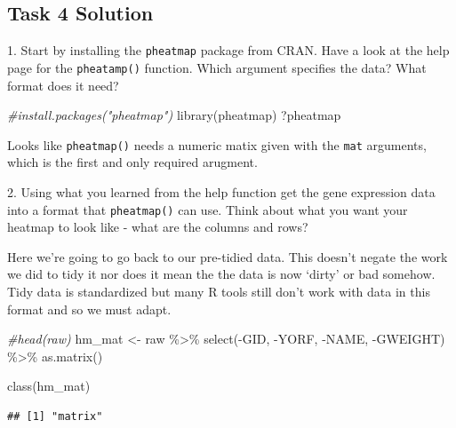 \documentclass[
]{book}
\newenvironment{Shaded}{\begin{snugshade}}{\end{snugshade}}
\newcommand{\CommentTok}[1]{\textcolor[rgb]{0.56,0.35,0.01}{\textit{#1}}}
\newcommand{\FunctionTok}[1]{\textcolor[rgb]{0.00,0.00,0.00}{#1}}
\newcommand{\NormalTok}[1]{#1}
\newcommand{\OtherTok}[1]{\textcolor[rgb]{0.56,0.35,0.01}{#1}}
\newcommand{\SpecialCharTok}[1]{\textcolor[rgb]{0.00,0.00,0.00}{#1}}
\begin{document}
\hypertarget{task-4-solution}{%
\subsection*{Task 4 Solution}\label{task-4-solution}}

1. Start by installing the \texttt{pheatmap} package from CRAN. Have a look at the help page for the \texttt{pheatamp()} function. Which argument specifies the data? What format does it need?

\begin{Shaded}
\begin{Highlighting}[]
\CommentTok{\#install.packages("pheatmap")}
\FunctionTok{library}\NormalTok{(pheatmap)}
\NormalTok{?pheatmap}
\end{Highlighting}
\end{Shaded}

Looks like \texttt{pheatmap()} needs a numeric matix given with the \texttt{mat} arguments, which is the first and only required arugment.

2. Using what you learned from the help function get the gene expression data into a format that \texttt{pheatmap()} can use. Think about what you want your heatmap to look like - what are the columns and rows?

Here we're going to go back to our pre-tidied data. This doesn't negate the work we did to tidy it nor does it mean the the data is now `dirty' or bad somehow. Tidy data is standardized but many R tools still don't work with data in this format and so we must adapt.

\begin{Shaded}
\begin{Highlighting}[]
\CommentTok{\#head(raw)}
\NormalTok{hm\_mat }\OtherTok{\textless{}{-}}\NormalTok{ raw }\SpecialCharTok{\%\textgreater{}\%}
  \FunctionTok{select}\NormalTok{(}\SpecialCharTok{{-}}\NormalTok{GID, }\SpecialCharTok{{-}}\NormalTok{YORF, }\SpecialCharTok{{-}}\NormalTok{NAME, }\SpecialCharTok{{-}}\NormalTok{GWEIGHT) }\SpecialCharTok{\%\textgreater{}\%}
  \FunctionTok{as.matrix}\NormalTok{()}

\FunctionTok{class}\NormalTok{(hm\_mat)}
\end{Highlighting}
\end{Shaded}

\begin{verbatim}
## [1] "matrix"
\end{verbatim}
\end{document}
